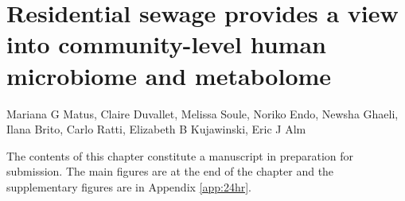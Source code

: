 
\graphicspath{{24hr/figures/}}

\chapter{Residential sewage provides a view into community-level human microbiome and metabolome}\label{chap:24hr}

\noindent
Mariana G Matus, Claire Duvallet, Melissa Soule, Noriko Endo, Newsha Ghaeli,  Ilana Brito, Carlo Ratti, Elizabeth B Kujawinski, Eric J Alm

\bigskip
\bigskip
\noindent
The contents of this chapter constitute a manuscript in preparation for submission. The main figures are at the end of the chapter and the supplementary figures are in Appendix \ref{app:24hr}.

\clearpage

